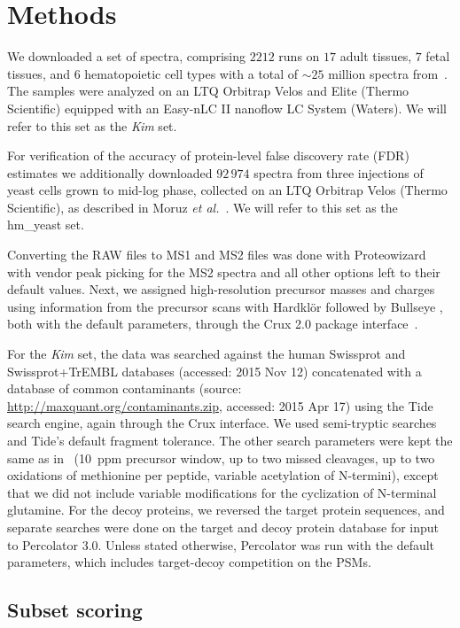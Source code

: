 \documentclass{article}
\begin{document}
\section*{Methods}

We downloaded a set of spectra, comprising $2212$ runs on $17$ adult
tissues, $7$ fetal tissues, and $6$ hematopoietic cell types with a
total of $\sim 25$ million spectra from~\cite{kim2014draft}. The
samples were analyzed on an LTQ Orbitrap Velos and Elite (Thermo
Scientific) equipped with an Easy-nLC II nanoflow LC System
(Waters). We will refer to this set as the {\em Kim} set.

For verification of the accuracy of protein-level false discovery rate 
(FDR) estimates we additionally downloaded $92\,974$ spectra from 
three injections of yeast cells grown to mid-log phase, collected on 
an LTQ Orbitrap Velos (Thermo Scientific), as described in Moruz {\em 
et al.}~\cite{moruz2013}.  We will refer to this set as the hm\_yeast 
set.

Converting the RAW files to MS1 and MS2 files was done with
Proteowizard~\cite{kessner2008} with vendor peak picking for the MS2
spectra and all other options left to their default values.  Next, we
assigned high-resolution precursor masses and charges using
information from the precursor scans with Hardkl\"{o}r
\cite{hoopmann2007} followed by Bullseye \cite{hsieh2009}, both with
the default parameters, through the Crux 2.0 package
interface~\cite{mcilwain2014}.

For the {\em Kim} set, the data was searched against the human
Swissprot and Swissprot+TrEMBL databases (accessed: 2015 Nov 12)
concatenated with a database of common contaminants (source:
\url{http://maxquant.org/contaminants.zip}, accessed: 2015 Apr 17)
using the Tide search engine, again through the Crux interface. We
used semi-tryptic searches and Tide's default fragment tolerance. The
other search parameters were kept the same as in~\cite{kim2014draft}
(10~ppm precursor window, up to two missed cleavages, up to two
oxidations of methionine per peptide, variable acetylation of
N-termini), except that we did not include variable modifications for
the cyclization of N-terminal glutamine.  For the decoy proteins, we
reversed the target protein sequences, and separate searches were done
on the target and decoy protein database for input to Percolator
3.0. Unless stated otherwise, Percolator was run with the default
parameters, which includes target-decoy competition on the PSMs.

\subsection*{Subset scoring}
\end{document}
